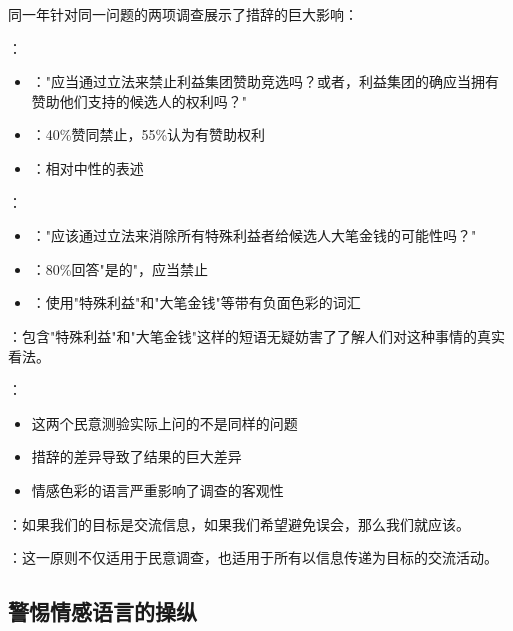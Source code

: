 \begin{examplebox}[title=1993年竞选资助调查的对比分析]
同一年针对同一问题的两项调查展示了措辞的巨大影响：

：
\begin{itemize}
  \item {}："应当通过立法来禁止利益集团赞助竞选吗？或者，利益集团的确应当拥有赞助他们支持的候选人的权利吗？"
  \item {}：40\%赞同禁止，55\%认为有赞助权利
  \item {}：相对中性的表述
\end{itemize}

：
\begin{itemize}
  \item {}："应该通过立法来消除所有特殊利益者给候选人大笔金钱的可能性吗？"
  \item {}：80\%回答"是的"，应当禁止
  \item {}：使用"特殊利益"和"大笔金钱"等带有负面色彩的词汇
\end{itemize}

：包含"特殊利益"和"大笔金钱"这样的短语无疑妨害了了解人们对这种事情的真实看法。\cite{perot1993}\cite{timecnn1993}

：
\begin{itemize}
  \item 这两个民意测验实际上问的不是同样的问题
  \item 措辞的差异导致了结果的巨大差异
  \item 情感色彩的语言严重影响了调查的客观性
\end{itemize}
\end{examplebox}

\begin{theorembox}[title=信息交流的语言原则]
：如果我们的目标是交流信息，如果我们希望避免误会，那么我们就应该。

：这一原则不仅适用于民意调查，也适用于所有以信息传递为目标的交流活动。
\end{theorembox}

\subsection{警惕情感语言的操纵}

